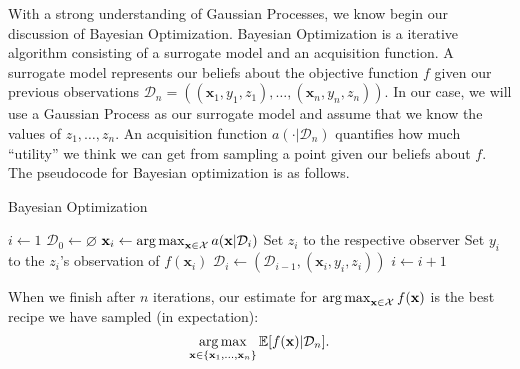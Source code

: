 With a strong understanding of Gaussian Processes, we know begin our discussion of Bayesian Optimization.
Bayesian Optimization is a iterative algorithm consisting of a surrogate model and an acquisition function.
A surrogate model represents our beliefs about the objective function $f$ given our previous observations $\mathcal{D}_n = ((\mathbf{x}_1, y_1, z_1), \dots, (\mathbf{x}_n, y_n, z_n))$.
In our case, we will use a Gaussian Process as our surrogate model and assume that we know the values of $z_1, \dots, z_n$.
An acquisition function $a( \cdot | \mathcal{D}_n)$
quantifies how much ``utility'' we think we can get from sampling a point given our beliefs about $f$.
The pseudocode for Bayesian optimization is as follows.

\begin{algorithm}
    \begin{algorithmic}
        \caption{Bayesian Optimization}\label{alg:bo}
        \State $i \gets 1$
        \State $\mathcal{D}_0 \gets \varnothing$
        \State $\mathbf{x}_i \gets \operatorname*{arg\,max}_{\mathbf{x} \in \mathcal{X}} a(\mathbf{x} | \mathcal{D}_i)$  
        \State Set $z_i$ to the respective observer
        \State Set $y_i$ to the $z_i$'s observation of $f(\mathbf{x}_i)$
        \State $\mathcal{D}_i \gets (\mathcal{D}_{i - 1}, (\mathbf{x}_i, y_i, z_i))$
        \State $i \gets i + 1$
        \EndWhile
    \end{algorithmic}
\end{algorithm}
When we finish after $n$ iterations, our estimate for $\operatorname*{arg\,max}_{\mathbf{x} \in \mathcal{X}}f(\mathbf{x})$ is
the best recipe we have sampled (in expectation):
\begin{equation*}
    \operatorname*{arg\,max}_{\mathbf{x} \in \{ \mathbf{x}_1, \dots, \mathbf{x}_n \} } \mathbb{E}[f(\mathbf{x}) | \mathcal{D}_n].
\end{equation*}


